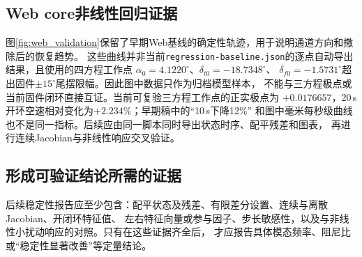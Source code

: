

\subsection{Web core非线性回归证据}

图\ref{fig:web_validation}保留了早期Web基线的确定性轨迹，用于说明通道方向和撤除后的恢复趋势。
这些曲线并非当前\texttt{regression-baseline.json}的逐点自动导出结果，且使用的四方程工作点
$\alpha_0=4.1220^\circ$、$\delta_{t0}=-18.7348^\circ$、
$\delta_{f0}=-1.5731^\circ$超出固件$\pm15^\circ$尾摆限幅。因此图中数据只作为归档模型样本，
不能与三方程极点或当前固件闭环直接互证。当前可复验三方程工作点的正实极点为
$+0.0176657$，20\,s开环空速相对变化为$+2.234\%$；早期稿中的“10\,s下降12\%”
和图中毫米每秒级曲线也不是同一指标。后续应由同一脚本同时导出状态时序、配平残差和图表，
再进行连续Jacobian与非线性响应交叉验证。



\subsection{形成可验证结论所需的证据}

后续稳定性报告应至少包含：配平状态及残差、有限差分设置、连续与离散Jacobian、开闭环特征值、
左右特征向量或参与因子、步长敏感性，以及与非线性小扰动响应的对照。只有在这些证据齐全后，
才应报告具体模态频率、阻尼比或“稳定性显著改善”等定量结论。
